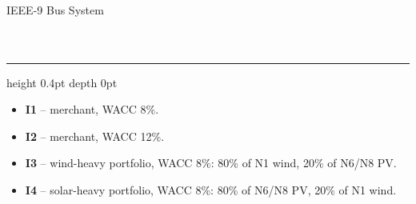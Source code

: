 \documentclass[10pt]{beamer}
\begin{document}
\begin{frame}{IEEE-9 Bus System   }
\begin{columns}[c,onlytextwidth]
    \centering
    {\footnotesize
    \renewcommand{\arraystretch}{1.25}
    }
\end{columns}

\vspace{0.50cm}
\hrule height 0.4pt depth 0pt \relax
\vspace{0.30cm}

{\footnotesize
\begin{itemize}
    \setlength{\itemsep}{0.12cm}
    \item \textbf{I1} -- merchant, WACC 8\%.
    \item \textbf{I2} -- merchant, WACC 12\%.
    \item \textbf{I3} -- wind-heavy portfolio, WACC 8\%: 80\% of N1 wind, 20\% of N6/N8 PV.
    \item \textbf{I4} -- solar-heavy portfolio, WACC 8\%: 80\% of N6/N8 PV, 20\% of N1 wind.
\end{itemize}}
\end{frame}
\end{document}
